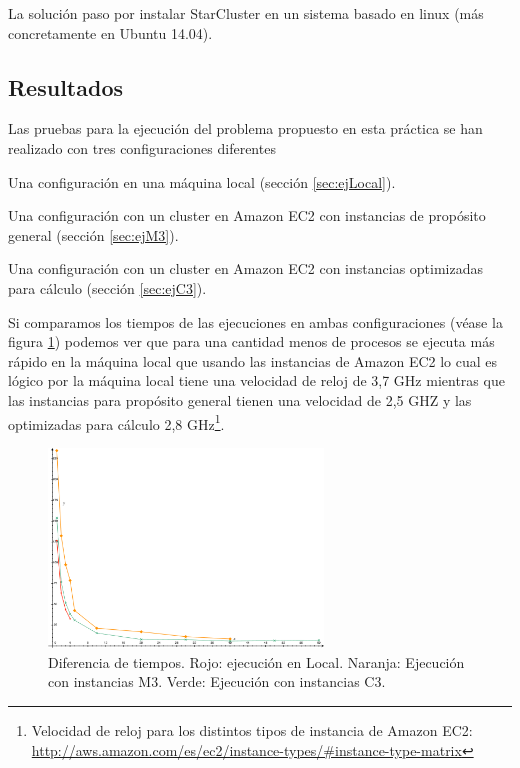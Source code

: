 \documentclass{article}
\begin{document}
	La solución paso por instalar StarCluster en un sistema basado en linux (más concretamente en Ubuntu 14.04).

\subsection{Resultados}
	Las pruebas para la ejecución del problema propuesto en esta práctica se han realizado con tres configuraciones diferentes
{\setlength{\parskip}{0mm}\begin{enumerate}
{\setlength{\parskip}{0mm}
	\item Una configuración en una máquina local (sección \ref{sec:ejLocal}).
	\item Una configuración con un cluster en Amazon EC2 con instancias de propósito general (sección \ref{sec:ejM3}).
	\item Una configuración con un cluster en Amazon EC2 con instancias optimizadas para cálculo (sección \ref{sec:ejC3}).
}
\end{enumerate}}
	Si comparamos los tiempos de las ejecuciones en ambas configuraciones (véase la figura \ref{fig:time}) podemos ver que para una cantidad menos de procesos se ejecuta más rápido en la máquina local que usando las instancias de Amazon EC2 lo cual es lógico por la máquina local tiene una velocidad de reloj de 3,7 GHz mientras que las instancias para propósito general tienen una velocidad de 2,5 GHZ y las optimizadas para cálculo 2,8 GHz\footnote{ Velocidad de reloj para los distintos tipos de instancia de Amazon EC2: \url{http://aws.amazon.com/es/ec2/instance-types/\#instance-type-matrix}}.


\begin{figure}[h]
  \centering
    \includegraphics[width=0.65\textwidth]{img/time.pdf}
  \caption{Diferencia de tiempos. Rojo: ejecución en Local. Naranja: Ejecución con instancias M3. Verde: Ejecución con instancias C3.}
  \label{fig:time}
\end{figure}
\end{document}

